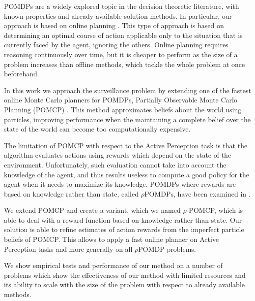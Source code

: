 POMDPs are a widely explored topic in the decision theoretic literature, with known properties and
already available solution methods. In particular, our approach is based on online planning
\cite{cit:relworkonlineall}. This type of approach is based on determining an optimal course of
action applicable only to the situation that is currently faced by the agent, ignoring the others.
Online planning requires reasoning continuously over time, but it is cheaper to perform as the size
of a problem increases than offline methods, which tackle the whole problem at once beforehand.


In this work we approach the surveillance problem by extending one of the fastest online Monte Carlo
planners for POMDPs, Partially Observable Monte Carlo Planning (POMCP) \cite{cit:pomcp}. This
method approximates beliefs about the world using particles, improving performance when the
maintaining a complete belief over the state of the world can become too computationally expensive.

The limitation of POMCP with respect to the Active Perception task is that the algorithm evaluates
actions using rewards which depend on the state of the environment. Unfortunately, such evaluation
cannot take into account the knowledge of the agent, and thus results useless to compute a good
policy for the agent when it needs to maximize its knowledge. POMDPs where rewards are based on
knowledge rather than state, called $\rho$POMDPs, have been examined in \cite{cit:rpomdp}.


We extend POMCP and create a variant, which we named $\rho$-POMCP, which is able to deal with a
reward function based on knowledge rather than state. Our solution is able to refine estimates of
action rewards from the imperfect particle beliefs of POMCP. This allows to apply a fast online
planner on Active Perception tasks and more generally on all $\rho$POMDP problems.


We show empirical tests and performance of our method on a number of problems which show the
effectiveness of our method with limited resources and its ability to scale with the size of the
problem with respect to already available methods.

